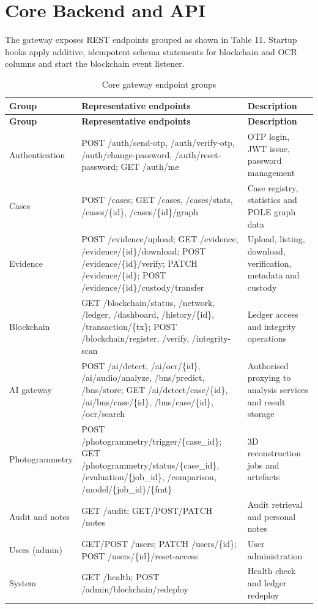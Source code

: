 \documentclass[12pt,a4paper,oneside]{report}
\begin{document}
\section{Core Backend and API}
The gateway exposes REST endpoints grouped as shown in Table 11. Startup hooks apply additive, idempotent schema statements for blockchain and OCR columns and start the blockchain event listener.

{\footnotesize
\setlength{\tabcolsep}{3pt}
\renewcommand{\arraystretch}{1.15}
\begin{longtable}{|>{\raggedright\arraybackslash}p{2.46cm}|>{\raggedright\arraybackslash}p{7.01cm}|>{\raggedright\arraybackslash}p{4.73cm}|}
\caption{Core gateway endpoint groups}\\
\hline
\rowcolor{headfill}\textbf{Group} & \textbf{Representative endpoints} & \textbf{Description} \\ \hline
\endfirsthead
\hline
\rowcolor{headfill}\textbf{Group} & \textbf{Representative endpoints} & \textbf{Description} \\ \hline
\endhead
\hline \endfoot
Authentication & POST /auth/send-otp, /auth/verify-otp, /auth/change-password, /auth/reset-password; GET /auth/me & OTP login, JWT issue, password management \\ \hline
Cases & POST /cases; GET /cases, /cases/stats, /cases/\{id\}, /cases/\{id\}/graph & Case registry, statistics and POLE graph data \\ \hline
Evidence & POST /evidence/upload; GET /evidence, /evidence/\{id\}/download; POST /evidence/\{id\}/verify; PATCH /evidence/\{id\}; POST /evidence/\{id\}/custody/transfer & Upload, listing, download, verification, metadata and custody \\ \hline
Blockchain & GET /blockchain/status, /network, /ledger, /dashboard, /history/\{id\}, /transaction/\{tx\}; POST /blockchain/register, /verify, /integrity-scan & Ledger access and integrity operations \\ \hline
AI gateway & POST /ai/detect, /ai/ocr/\{id\}, /ai/audio/analyze, /bns/predict, /bns/store; GET /ai/detect/case/\{id\}, /ai/bns/case/\{id\}, /bns/case/\{id\}, /ocr/search & Authorised proxying to analysis services and result storage \\ \hline
Photogrammetry & POST /photogrammetry/trigger/\{case\_id\}; GET /photogrammetry/status/\{case\_id\}, /evaluation/\{job\_id\}, /comparison, /model/\{job\_id\}/\{fmt\} & 3D reconstruction jobs and artefacts \\ \hline
Audit and notes & GET /audit; GET/POST/PATCH /notes & Audit retrieval and personal notes \\ \hline
Users (admin) & GET/POST /users; PATCH /users/\{id\}; POST /users/\{id\}/reset-access & User administration \\ \hline
System & GET /health; POST /admin/blockchain/redeploy & Health check and ledger redeploy \\ \hline
\end{longtable}
}
\end{document}

